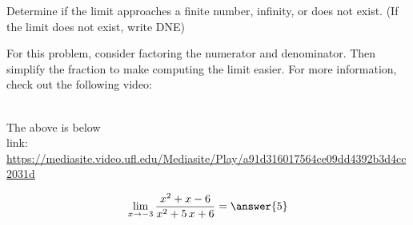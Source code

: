 \documentclass[handout]{ximera}
\begin{document}
\begin{problem}
Determine if the limit approaches a finite number, infinity, or does not exist. (If the limit does not exist, write DNE)  \vspace{5pt}
\begin{hint}
For this problem, consider factoring the numerator and denominator.  Then simplify the fraction to make computing the limit easier.  For more information, check out the following video:
\end{hint}
\begin{hint}
\\
The above is below\\
{link: \url{https://mediasite.video.ufl.edu/Mediasite/Play/a91d316017564ce09dd4392b3d4cc2031d}}
\end{hint}


\[\lim_{x\to{{-3}}}\dfrac{{{x^{2} + x - 6}}}{{{x^{2} + 5 \, x + 6}}}=\answer{{{5}}}\]
\end{problem}%








\end{document}

